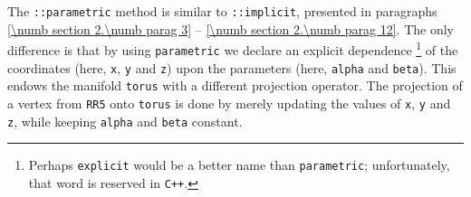 The {\small\tt {}::parametric} method is similar to {\small\tt {}::implicit},
presented in paragraphs \ref{\numb section 2.\numb parag 3} --
\ref{\numb section 2.\numb parag 12}.
The only difference is that by using {\small\tt parametric} we declare an explicit dependence%
\footnote {Perhaps {\small\tt explicit} would be a better name than {\small\tt parametric};
unfortunately, that word is reserved in {\small\tt C++}.}
of the coordinates (here, {\small\tt x}, {\small\tt y} and {\small\tt z}) upon the parameters
(here, {\small\tt alpha} and {\small\tt beta}).
This endows the manifold {\small\tt torus} with a different projection operator.
The projection of a vertex from {\small\tt RR5} onto {\small\tt torus} is done by merely updating
the values of {\small\tt x}, {\small\tt y} and {\small\tt z}, while keeping {\small\tt alpha} and
{\small\tt beta} constant.
